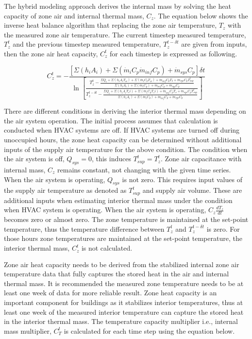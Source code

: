 The hybrid modeling approach derives the internal mass by solving the heat capacity of zone air and internal thermal mass, $C_z$. The equation below shows the inverse heat balance algorithm that replacing the zone air temperature, $T_z$ with the measured zone air temperature. The current timestep measured temperature, $T_z^t$  and the previous timestep measured temperature, $T_z^{t-\delta t}$ are given from inputs, then the zone air heat capacity, $C_z^t$ for each timestep is expressed as following.

\begin{equation}
C_z^t = - \frac {[\Sigma (h_i A_i) + \Sigma (\dot{m}_i C_p \dot{m}_{inf} C_p) + \dot{m}_{sys} C_p ] \delta t}{ \ln \left[ \frac { T_z^t - \frac { \Sigma Q_i +\Sigma (h_i A_i T_{si}) + \Sigma (\dot{m}_i C_p T_{zi}) + \dot{m}_{inf} C_p T_o + \dot{m}_{sys} C_p T_{sup}^t} {\Sigma (h_i A_i)  + \Sigma (\dot{m}_i C_p)  + \dot{m}_{inf} C_p + \dot{m}_{sys} C_p}} {T_z^{t-\delta t} - \frac {\Sigma Q_i +\Sigma (h_i A_i T_si)  + \Sigma (\dot{m}_i C_p T_zi) + \dot{m}_{inf} C_p T_o + \dot{m}_{sys} C_p T_{sup}^t} {\Sigma (h_i A_i) + \Sigma (\dot{m}_i C_p)  + \dot{m}_{inf} C_p + \dot{m}_{sys} C_p}} \right]}
\label{eq:ZoneAirHeatCapacityforEachTimestep}
\end{equation}

There are different conditions in deriving the interior thermal mass depending on the air system operation. The initial process assumes that calculation is conducted when HVAC systems are off. If HVAC systems are turned off during unoccupied hours, the zone heat capacity can be determined without additional inputs of the supply air temperature for the above condition. The condition when the air system is off, $Q_{sys}=0$, this induces $T_{sup}^t=T_z^t$.  Zone air capacitance with internal mass, $C_z$  remains constant, not changing with the given time series. When the air system is operating, $Q_{sys}$ is not zero. This requires input values of the supply air temperature as denoted as $T_{sup}^t$ and supply air volume. These are additional inputs when estimating interior thermal mass under the condition when HVAC system is operating. When the air system is operating, $C_z \frac {dT_z} {dt}$ becomes zero or almost zero. The zone temperature is maintained at the set-point temperature, thus the temperature difference between $T_z^t$  and $T_z^{t-\delta t}$ is zero. For those hours zone temperatures are maintained at the set-point temperature, the interior thermal mass, $C_z^t$ is not calculated.

Zone air heat capacity needs to be derived from the stabilized internal zone air temperature data that fully captures the stored heat in the air and internal thermal mass. It is recommended the measured zone temperature needs to be at least one week of data for more reliable result. Zone heat capacity is an important component for buildings as it stabilizes interior temperatures, thus at least one week of the measured interior temperature can capture the stored heat in the interior thermal mass. The temperature capacity multiplier i.e., internal mass multiplier, $C_T^t$ is calculated for each time step using the equation below.


